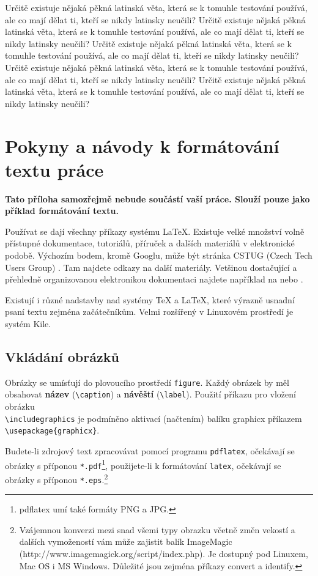 \documentclass[11pt,twoside,a4paper]{book}
\begin{document}
	Určitě existuje nějaká pěkná latinská věta, která se k tomuhle testování používá, ale co mají dělat ti, kteří se nikdy latinsky neučili? Určitě existuje nějaká pěkná latinská věta, která se k tomuhle testování používá, ale co mají dělat ti, kteří se nikdy latinsky neučili? Určitě existuje nějaká pěkná latinská věta, která se k tomuhle testování používá, ale co mají dělat ti, kteří se nikdy latinsky neučili? Určitě existuje nějaká pěkná latinská věta, která se k tomuhle testování používá, ale co mají dělat ti, kteří se nikdy latinsky neučili? Určitě existuje nějaká pěkná latinská věta, která se k tomuhle testování používá, ale co mají dělat ti, kteří se nikdy latinsky neučili?
	
	\chapter{Pokyny a návody k formátování textu práce}
	\textbf{\large Tato příloha samozřejmě nebude součástí vaší práce. Slouží pouze jako příklad formátování textu.}
	
	Používat se dají všechny příkazy systému \LaTeX. Existuje velké množství volně přístupné dokumentace, tutoriálů, příruček a dalších materiálů v elektronické podobě. Výchozím bodem, kromě Googlu, může být stránka CSTUG (Czech Tech Users Group) \cite{CSTUG}. Tam najdete odkazy na další materiály.  Vetšinou dostačující a přehledně organizovanou elektronikou dokumentaci najdete například na \cite{latexdocweb} nebo \cite{latexwiki}.
	
	Existují i různé nadstavby nad systémy \TeX{} a \LaTeX, které výrazně usnadní psaní textu zejména začátečníkům. Velmi rozšířený v Linuxovém prostředí je systém Kile.
	
	
	\section{Vkládání obrázků}
	Obrázky se umísťují do plovoucího prostředí \verb|figure|. Každý obrázek by měl obsahovat \textbf{název} (\verb|\caption|) a \textbf{návěští} (\verb|\label|). Použití příkazu pro vložení obrázku \\\verb|\includegraphics| je podmíněno aktivací (načtením) balíku graphicx příkazem\\ \verb|\usepackage{graphicx}|.
	
	Budete-li zdrojový text zpracovávat pomocí programu \verb|pdflatex|, očekávají se obrázky s příponou \verb|*.pdf|\footnote{pdflatex umí také formáty PNG a JPG.}, použijete-li k formátování \verb|latex|, očekávají se obrázky s příponou \verb|*.eps|.\footnote{Vzájemnou konverzi mezi snad všemi typy obrazku včetně změn vekostí a dalších vymožeností vám může zajistit balík ImageMagic  (http://www.imagemagick.org/script/index.php). Je dostupný pod Linuxem, Mac OS i MS Windows. Důležité jsou zejména příkazy convert a identify.}
	
\end{document}
